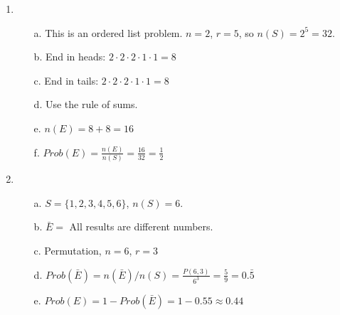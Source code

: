 {\begin{enumerate}
        \item
            \begin{itemize}
                \item[a.]   This is an ordered list problem. $n = 2$, $r = 5$, so $n(S) = 2^{5} = 32$.
                \item[b.]   End in heads: $2 \cdot 2 \cdot 2 \cdot 1 \cdot 1 = 8$
                \item[c.]   End in tails: $2 \cdot 2 \cdot 2 \cdot 1 \cdot 1 = 8$
                \item[d.]   Use the rule of sums.
                \item[e.]   $n(E) = 8 + 8 = 16$
                \item[f.]   $Prob(E) = \frac{n(E)}{n(S)} = \frac{16}{32} = \frac{1}{2}$
            \end{itemize}

        \item
            \begin{itemize}
                \item[a.]   $S = \{1, 2, 3, 4, 5, 6\}$, $n(S) = 6$.
                \item[b.]   $\bar{E} = $ All results are different numbers.
                \item[c.]   Permutation, $n = 6$, $r = 3$
                \item[d.]   $Prob(\bar{E}) = n(\bar{E}) / n(S) = \frac{P(6,3)}{6^{3}} = \frac{5}{9} = 0.\bar{5}$
                \item[e.]   $Prob(E) = 1 - Prob(\bar{E}) = 1 - 0.55 \approx 0.44$
            \end{itemize}
    \end{enumerate}

}


